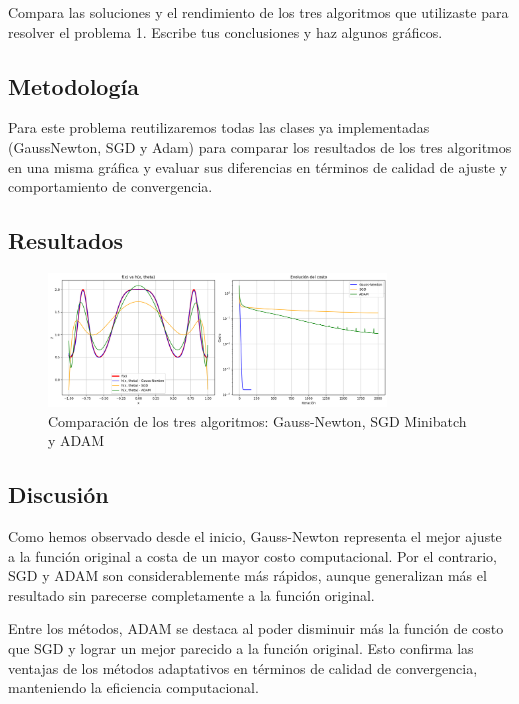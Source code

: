 \documentclass{article}
\begin{document}
Compara las soluciones y el rendimiento de los tres algoritmos que utilizaste para resolver el problema 1. Escribe tus conclusiones y haz algunos gráficos.

\subsection{Metodología}

Para este problema reutilizaremos todas las clases ya implementadas (GaussNewton, SGD y Adam) para comparar los resultados de los tres algoritmos en una misma gráfica y evaluar sus diferencias en términos de calidad de ajuste y comportamiento de convergencia.

\subsection{Resultados}
\setcounter{equation}{0}

\begin{figure}[H]
    \centering
    \includegraphics[width=0.8\textwidth]{images/5_comparation_algorithms.png}
    \caption{Comparación de los tres algoritmos: Gauss-Newton, SGD Minibatch y ADAM}
    \label{fig:comparison_algorithms}
\end{figure}

\subsection{Discusión}

Como hemos observado desde el inicio, Gauss-Newton representa el mejor ajuste a la función original a costa de un mayor costo computacional. Por el contrario, SGD y ADAM son considerablemente más rápidos, aunque generalizan más el resultado sin parecerse completamente a la función original.

Entre los métodos, ADAM se destaca al poder disminuir más la función de costo que SGD y lograr un mejor parecido a la función original. Esto confirma las ventajas de los métodos adaptativos en términos de calidad de convergencia, manteniendo la eficiencia computacional.
\end{document}
